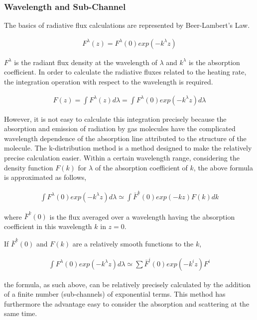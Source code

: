 \hypertarget{wavelength-and-sub-channel}{%
\subsubsection{Wavelength and Sub-Channel}\label{wavelength-and-sub-channel}}

The basics of radiative flux calculations are represented by Beer-Lambert's Law.

\begin{eqnarray}
  F^\lambda(z) = F^\lambda(0) exp (-k^\lambda z)
\end{eqnarray}

\(F^{\lambda}\) is the radiant flux density at the wavelength of \(\lambda\) and \(k^{\lambda}\) is the absorption coefficient. In order to calculate the radiative fluxes related to the heating rate,
the integration operation with respect to the wavelength is required.

\begin{eqnarray}
  F(z) = \int F^\lambda(z) d \lambda= \int F^\lambda(0) exp (-k^\lambda z) d \lambda
\end{eqnarray}

However, it is not easy to calculate this integration precisely because the absorption and emission of radiation by gas molecules have the complicated wavelength dependence of the absorption line
attributed to the structure of the molecule. The k-distribution method is a method designed to make the relatively precise calculation easier. Within a certain wavelength range, considering the
density function \(F(k)\) for \(\lambda\) of the absorption coefficient of \(k\), the above formula is approximated as follows,

\begin{eqnarray}
 \int F^\lambda(0) exp (-k^\lambda z) d \lambda
 \simeq \int \bar{F}^k(0) exp (-k z) F(k) dk
\end{eqnarray}

where \(\bar{F}^k(0)\) is the flux averaged over a wavelength having the absorption coefficient in this wavelength \(k\) in \(z=0\).

If \(\bar{F}^k(0)\) and \(F(k)\) are a relatively smooth functions to the \(k\),

\begin{eqnarray}
 \int F^\lambda(0) exp (-k^\lambda z) d \lambda
 \simeq \sum \bar{F}^i(0) exp (-k^i z) F^i
\end{eqnarray}

the formula, as such above, can be relatively precisely calculated by the addition of a finite number (sub-channels) of exponential terms. This method has furthermore the advantage easy to consider
the absorption and scattering at the same time.

